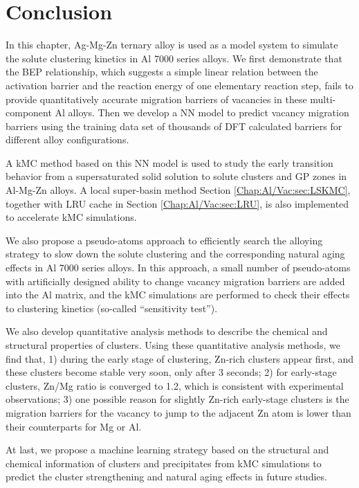 \section{Conclusion}
\label{Chap:Al/Vac:section:Conc}


In this chapter, Ag-Mg-Zn ternary alloy is used as a model system to simulate the solute clustering kinetics in Al 7000 series alloys. We first demonstrate that the \acf{BEP} relationship, which suggests a simple linear relation between the activation barrier and the reaction energy of one elementary reaction step, fails to provide quantitatively accurate migration barriers of vacancies in these multi-component Al alloys. Then we develop a \ac{NN} model to predict vacancy migration barriers using the training data set of thousands of \ac{DFT} calculated barriers for different alloy configurations. 

A \ac{kMC} method based on this \ac{NN} model is used to study the early transition behavior from a supersaturated solid solution to solute clusters and \acf{GP} zones in Al-Mg-Zn alloys. A local super-basin method  Section \ref{Chap:Al/Vac:sec:LSKMC}, together with \ac{LRU} cache in Section \ref{Chap:Al/Vac:sec:LRU}, is also implemented to accelerate \ac{kMC} simulations. 

We also propose a pseudo-atoms approach to efficiently search the alloying strategy to slow down the solute clustering and the corresponding natural aging effects in Al 7000 series alloys. In this approach, a small number of pseudo-atoms with artificially designed ability to change vacancy migration barriers are added into the Al matrix, and the \ac{kMC} simulations are performed to check their effects to clustering kinetics (so-called ``sensitivity test''). 

We also develop quantitative analysis methods to describe the chemical and structural properties of clusters. Using these quantitative analysis methods, we find that, 1) during the early stage of clustering, Zn-rich clusters appear first, and these clusters become stable very soon, only after 3 seconds; 2) for early-stage clusters, Zn/Mg ratio is converged to 1.2, which is consistent with experimental observations; 3) one possible reason for slightly Zn-rich early-stage clusters is the migration barriers for the vacancy to jump to the adjacent Zn atom is lower than their counterparts for Mg or Al. 

At last, we propose a machine learning strategy based on the structural and chemical information of clusters and precipitates from \ac{kMC} simulations to predict the cluster strengthening and natural aging effects in future studies.